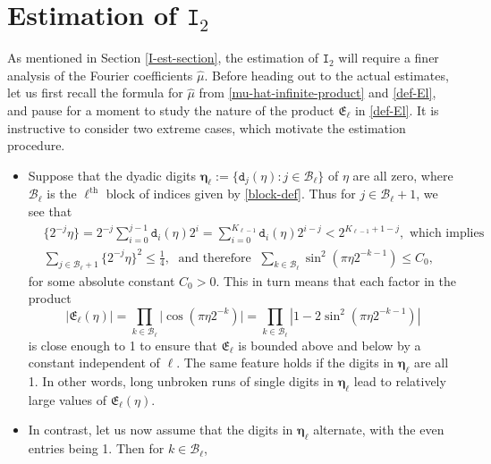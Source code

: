 \documentclass[12pt, twoside]{article}
\theoremstyle{definition}
\numberwithin{equation}{section}
\begin{document}
\section{Estimation of $\mathtt I_2$} \label{I2-lemma-proof-section} 
As mentioned in Section \ref{I-est-section}, the estimation of $\mathtt I_2$ will require a finer analysis of the Fourier coefficients $\widehat{\mu}$. 
Before heading out to the actual estimates, let us first recall the formula for $\widehat{\mu}$ from \eqref{mu-hat-infinite-product} and \eqref{def-El}, and pause for a moment to study the nature of the product $\mathfrak E_{\ell}$ in \eqref{def-El}. It is instructive to consider two extreme cases, which motivate the estimation procedure. 
\begin{itemize} 
\item Suppose that the dyadic digits $\pmb{\eta}_{\ell} := \{\mathtt d_j(\eta) :  j \in \mathcal B_{\ell}\}$ of $\eta$ are all zero, where $\mathcal B_{\ell}$ is the $\ell^{\text{th}}$ block of indices given by \eqref{block-def}. Thus for $j \in \mathcal B_{\ell}+1$, we see that 
\begin{align*}
&\bigl\{2^{-j} \eta \bigr\} = 2^{-j} \sum_{i = 0}^{j-1} \mathtt d_i(\eta) 2^i = \sum_{i = 0}^{K_{\ell-1}} \mathtt d_i(\eta) 2^{i-j} < 2^{K_{\ell-1} + 1 - j},  \text{ which implies } \\  
&\sum_{j \in \mathcal B_{\ell}+1} \bigl\{ 2^{-j} \eta \bigr\}^2 \leq \frac{1}{4}, \; \text{ and therefore } \; \sum_{k \in \mathcal B_{\ell}} \sin^{2} (\pi \eta 2^{-k-1}) \leq C_0, 
\end{align*} 
for some absolute constant $C_0 > 0$. This in turn means that each factor in the product
\begin{equation} \label{cos-product} \bigl| \mathfrak E_{\ell}(\eta) \bigr| = \prod_{k \in \mathcal B_{\ell}} \bigl| \cos (\pi \eta 2^{-k} )\bigr| = \prod_{k \in \mathcal B_{\ell}} \left|1 - 2 \sin^{2}(\pi \eta 2^{-k-1})\right|  \end{equation} 
is close enough to 1 to ensure that $\mathfrak E_{\ell}$ is bounded above and below by a constant independent of $\ell$. The same feature holds if the digits in $\pmb{\eta}_{\ell}$ are all 1. In other words, long unbroken runs of single digits in $\pmb{\eta}_{\ell}$ lead to relatively large values of $\mathfrak E_{\ell}(\eta)$. 
\item In contrast, let us now assume that the digits in $\pmb{\eta}_{\ell}$ alternate, with the even entries being 1.  Then for $k \in \mathcal B_{\ell}$, 
\begin{equation}  

\end{equation}
\end{itemize}
\end{document}
